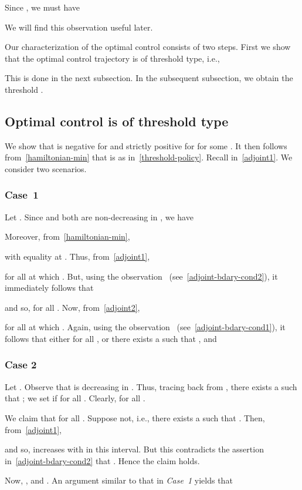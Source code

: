 \documentclass[10pt,journal,letterpaper]{IEEEtran}
\begin{document}
\begin{IEEEproof}
Since , we must have

 We will find this observation useful later.

Our characterization of the optimal control consists of two steps.
First we show that the optimal control trajectory is of threshold
type, i.e.,

This is done in the next subsection. In the subsequent subsection,
we obtain the threshold .

\subsection{Optimal control is of threshold type}
We show that  is negative for  and
strictly positive for  for some
. It then follows from~\eqref{hamiltonian-min} that
 is as in~\eqref{threshold-policy}. Recall  in~\eqref{adjoint1}. We consider two scenarios.
\subsubsection{Case~1}
\label{form-part1} Let . Since  and  both are non-decreasing in
, we have
 
Moreover, from~\eqref{hamiltonian-min},

with equality at . Thus, from~\eqref{adjoint1},

for all   at which . But, using the observation
~(see~\eqref{adjoint-bdary-cond2}), it immediately follows that

and so,  for all . Now, from~\eqref{adjoint2}, 

for all   at which .  Again, using the observation
~(see~\eqref{adjoint-bdary-cond1}), it follows that
either  for all , 
or there exists a  such that , and 


\subsubsection{Case 2}
\label{form-part2}
 Let .
Observe that  is decreasing in .
Thus, tracing back from , there exists a  such
that ; we set  if
 for all .
Clearly,  for all .

We claim that   for all . 
Suppose not, i.e., there exists a  such that
. Then, from~\eqref{adjoint1},

and so,  increases with  in this interval. But this
contradicts the assertion in~\eqref{adjoint-bdary-cond2} that
. Hence the claim holds.

Now, , and .
An argument similar to that in {\it Case~1} yields that 


\end{IEEEproof}
\end{document}
